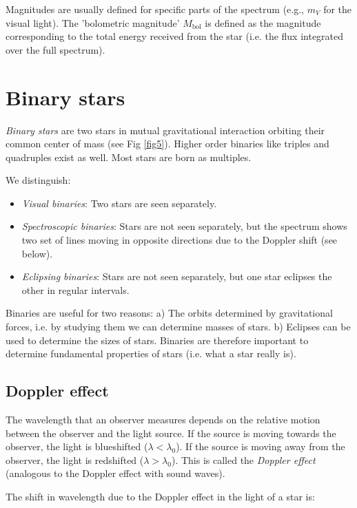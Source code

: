 Magnitudes are usually defined for specific parts of the spectrum (e.g., $m_V$ for the visual light).  The 'bolometric magnitude' $M_{\mathrm{bol}}$ is defined as the magnitude corresponding to the total energy received from the star (i.e. the flux integrated over the full spectrum).

\section{Binary stars}

\textit{Binary stars} are two stars in mutual gravitational interaction orbiting their common center of mass (see Fig \ref{fig5}). Higher order binaries like triples and quadruples exist as well. Most stars are born as multiples.

We distinguish:
\begin{itemize}
\item{\textit{Visual binaries}: Two stars are seen separately.}
\item{\textit{Spectroscopic binaries}: Stars are not seen separately, but the spectrum shows two set of lines moving in opposite directions due to the Doppler shift (see below).}
\item{\textit{Eclipsing binaries}: Stars are not seen separately, but one star eclipses the other in regular intervals.}
\end{itemize}

Binaries are useful for two reasons: a) The orbits determined by gravitational forces, i.e. by studying them we can determine masses of stars. b) Eclipses can be used to determine the sizes of stars. Binaries are therefore important to determine fundamental properties of stars (i.e. what a star really is).

\subsection{Doppler effect}

The wavelength that an observer measures depends on the relative motion between the observer and the light source. If the source is moving towards the observer, the light is blueshifted ($\lambda < \lambda_0$). If the source is moving away from the observer, the light is redshifted ($\lambda >\lambda_0$). This is called the \textit{Doppler effect} (analogous to the Doppler effect with sound waves).

The shift in wavelength due to the Doppler effect in the light of a star is:

